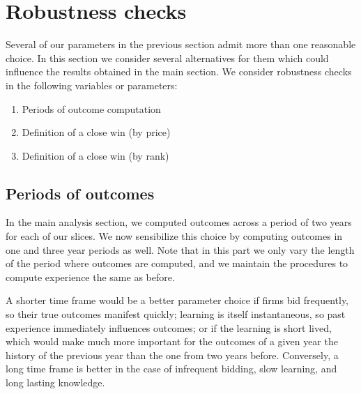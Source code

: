 

%


\section{Robustness checks}
Several of our parameters in the previous section admit more than one reasonable choice. In this section we consider several alternatives for them which could influence the results obtained in the main section. We consider robustness checks in the following variables or parameters:
\begin{enumerate}
  \item Periods of outcome computation
  \item Definition of a close win (by price)
  \item Definition of a close win (by rank)
\end{enumerate}
\subsection{Periods of outcomes}
In the main analysis section, we computed outcomes across a period of two years for each of our slices. We now sensibilize this choice by computing outcomes in one and three year periods as well. Note that in this part we only vary the length of the period where outcomes are computed, and we maintain the procedures to compute experience the same as before.

 A shorter time frame would be a better parameter choice if firms bid frequently, so their true outcomes manifest quickly;  learning is itself instantaneous,  so past experience immediately influences outcomes; or if the learning is short lived, which would make much more important for the outcomes of a given year the history of the previous year than the one from two years before. Conversely, a long time frame is better in the case of infrequent bidding, slow learning, and long lasting knowledge.

